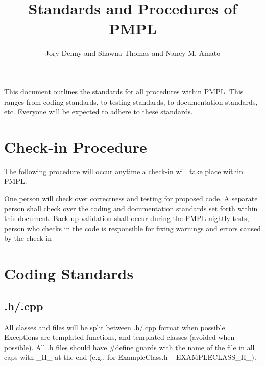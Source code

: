 \documentclass[12pt]{article}
\title{\Large \bf Standards and Procedures of PMPL}
\author{Jory Denny and Shawna Thomas and Nancy M. Amato}
\begin{document}
\thispagestyle{empty}
\pagestyle{empty}
\maketitle
\lstset{style=C++}

This document outlines the standards for all procedures within PMPL. This ranges from coding standards, to testing
standards, to documentation standards, etc. Everyone will be expected to adhere to these standards.


\section{Check-in Procedure}
The following procedure will occur anytime a check-in will take place within PMPL.
\begin{algorithmic}[1]
\STATE One person will check over correctness and testing for proposed code.
\STATE A separate person shall check over the coding and documentation standards set forth within this document.
\STATE Back up validation shall occur during the PMPL nightly tests, person who checks in the code is responsible for
fixing warnings and errors caused by the check-in
\end{algorithmic}


\section{Coding Standards}

\subsection{.h/.cpp}
All classes and files will be split between .h/.cpp format when possible. Exceptions are templated functions, and templated
classes (avoided when possible). All .h files should have \#define guards with the name of the file in all caps with
\_H\_ at the end (e.g., for ExampleClass.h -- EXAMPLECLASS\_H\_).
\end{document}
